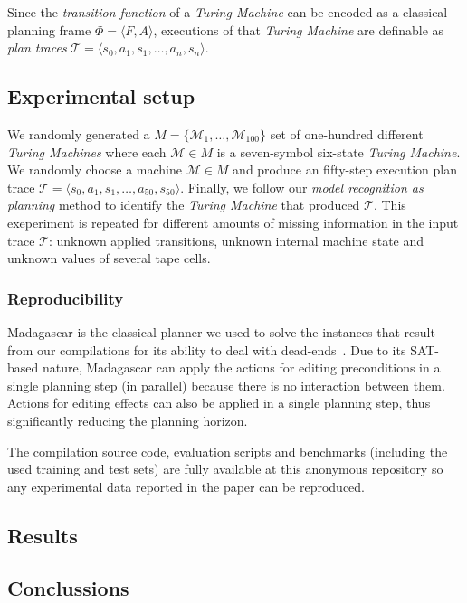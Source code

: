 \documentclass[letterpaper]{article} %
\newcommand{\tup}[1]{{\langle #1 \rangle}}
\begin{document}
Since the {\em transition function} of a {\em Turing Machine} can be encoded as a classical planning frame $\Phi=\tup{F,A}$, executions of that {\em Turing Machine} are definable as {\em plan traces} $\mathcal{T}=\tup{s_0,a_1,s_1,\ldots,a_n,s_n}$. 

\subsection{Experimental setup}
We randomly generated a $M=\{\mathcal{M}_1,\ldots,\mathcal{M}_{100}\}$ set of one-hundred different {\em Turing Machines} where each $\mathcal{M}\in M$ is a seven-symbol six-state {\em Turing Machine}. We randomly choose a machine $\mathcal{M}\in M$ and produce an fifty-step execution plan trace $\mathcal{T}=\tup{s_0,a_1,s_1,\ldots,a_{50},s_{50}}$. Finally, we follow our {\em model recognition as planning} method to identify the {\em Turing Machine} that produced $\mathcal{T}$. This exeperiment is repeated for different amounts of missing information in the input trace $\mathcal{T}$: unknown applied transitions, unknown internal machine state and unknown values of several tape cells.

\subsubsection{Reproducibility}
{\sc Madagascar} is the classical planner we used to solve the instances that result from our compilations for its ability to deal with dead-ends~\cite{rintanen2014madagascar}. Due to its SAT-based nature, {\sc Madagascar} can apply the actions for editing preconditions in a single planning step (in parallel) because there is no interaction between them. Actions for editing effects can also be applied in a single planning step, thus significantly reducing the planning horizon.

The compilation source code, evaluation scripts and benchmarks (including the used training and test sets) are fully available at this anonymous repository {\em } so any experimental data reported in the paper can be reproduced.

\subsection{Results}

\subsection{Conclussions}
\label{sec:conclussions}
\end{document}
